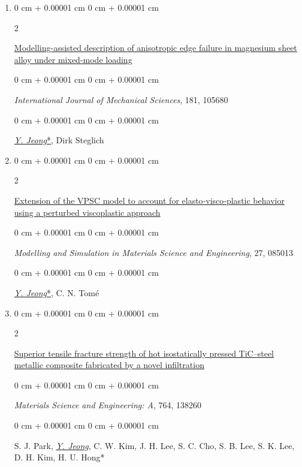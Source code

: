 \documentclass[10pt, letterpaper]{article}
\newenvironment{onecolentry}{
    \begin{adjustwidth}{
        0 cm + 0.00001 cm
    }{
        0 cm + 0.00001 cm
    }
}{
    \end{adjustwidth}
} %
\newenvironment{twocolentry}[2][]{
    \onecolentry
    \def\secondColumn{#2}
    \setcolumnwidth{\fill, 4.5 cm}
    \begin{paracol}{2}
}{
    \switchcolumn \raggedleft \secondColumn
    \end{paracol}
    \endonecolentry
} %
\begin{document}
\begin{enumerate}
        \item
        \begin{twocolentry}{2020}
            \href{https://doi.org/10.1016/j.ijmecsci.2020.105680}{Modelling-assisted description of anisotropic edge failure in magnesium sheet alloy under mixed-mode loading}
        \end{twocolentry}
        \begin{onecolentry}
            {\it International Journal of Mechanical Sciences}, 181, 105680
        \end{onecolentry}
        \begin{onecolentry}
            {\underline{\textit{Y. Jeong}*}}, Dirk Steglich
        \end{onecolentry}
        \vspace{0.10 cm}

        \item
        \begin{twocolentry}{2019}
            \href{https://doi.org/10.1088/1361-651X/ab4b66}{Extension of the VPSC model to account for elasto‑visco‑plastic behavior using a
            perturbed viscoplastic approach}
        \end{twocolentry}
        \begin{onecolentry}
            {\it Modelling and Simulation in Materials Science and Engineering}, 27, 085013
        \end{onecolentry}
        \begin{onecolentry}
            {\underline{\textit{Y. Jeong}*}}, C. N. Tomé
        \end{onecolentry}
        \vspace{0.10 cm}


        \item
        \begin{twocolentry}{2019}
            \href{https://doi.org/10.1016/j.msea.2019.138260}{Superior tensile fracture strength of hot isostatically pressed TiC–steel metallic composite fabricated by a novel infiltration}
        \end{twocolentry}
        \begin{onecolentry}
            {\it Materials Science and Engineering: A}, 764, 138260
        \end{onecolentry}
        \begin{onecolentry}
            S. J. Park, {\underline{\textit{Y. Jeong}}}, C. W. Kim, J. H. Lee, S. C. Cho, S. B. Lee, S. K. Lee, D. H. Kim, H. U. Hong*
        \end{onecolentry}
        \vspace{0.10 cm}




\end{enumerate}
\end{document}
